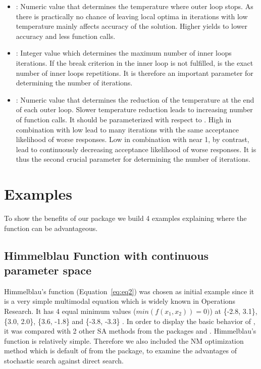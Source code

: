 \begin{itemize}
\item {}: Numeric value that determines the temperature where outer loop stops. As there is practically no chance of leaving local optima in iterations with low temperature  mainly affects accuracy of the solution. Higher  yields to lower accuracy and less function calls.
\item {}: Integer value which determines the maximum number of inner loops iterations. If the break criterion in the inner loop is not fulfilled,  is the exact number of inner loops repetitions. It is therefore an important parameter for determining the number of iterations.
\item {}: Numeric value that determines the reduction of the temperature at the end of each outer loop. Slower temperature reduction leads to increasing number of function calls. It should be parameterized with respect to . High  in combination with low  lead to many iterations with the same acceptance likelihood of worse responses. Low  in combination with  near 1, by contrast, lead to continuously decreasing acceptance likelihood of worse responses. It is thus the second crucial parameter for determining the number of iterations.
\end{itemize}

\section{Examples}
To show the benefits of our  package we build 4 examples explaining where the  function can be advantageous.

\subsection{Himmelblau Function with continuous parameter space}
Himmelblau's function (Equation~\eqref{eq:eq2}) \citep{himmelblau_1972} was chosen as initial example since it is a very simple multimodal equation which is widely known in Operations Research. It has 4 equal minimum values ($min(f(x_1,x_2))=0)$) at \{-2.8, 3.1\}, \{3.0, 2.0\}, \{3.6, -1.8\} and \{-3.8, -3.3\} . In order to display the basic behavior of , it was compared with 2 other SA methods from the packages  and . Himmelblau's function is relatively simple. Therefore we  also included the NM optimization method \citep{nelder_1965} which is default of  from the  package, to examine the advantages of stochastic search against direct search.


